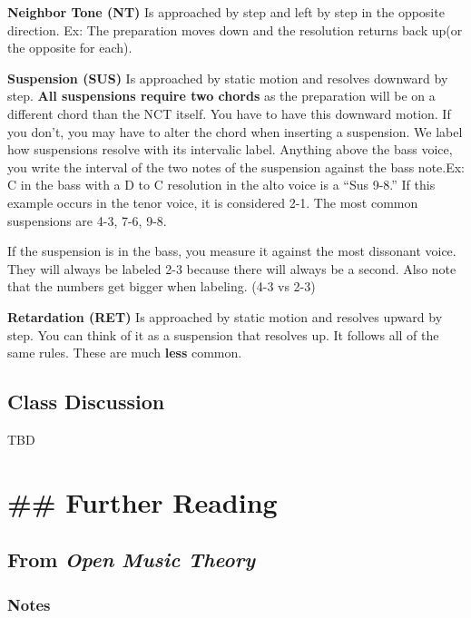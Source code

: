 \documentclass{book}
\begin{document}
\textbf{Neighbor Tone (NT)} Is approached by step and left by step in the
opposite direction. Ex: The preparation moves down and the resolution returns
back up(or the opposite for each).

\textbf{Suspension (SUS)} Is approached by static motion and resolves downward
by step. \textbf{All suspensions require two chords} as the preparation will
be on a different chord than the NCT itself. You have to have this downward
motion. If you don't, you may have to alter the chord when inserting a
suspension. We label how suspensions resolve with its intervalic label.
Anything above the bass voice, you write the interval of the two notes of the
suspension against the bass note.Ex: C in the bass with a D to C resolution in
the alto voice is a ``Sus 9-8.'' If this example occurs in the tenor voice, it
is considered 2-1. The most common suspensions are 4-3, 7-6, 9-8.

If the suspension is in the bass, you measure it against the most dissonant
voice. They will always be labeled 2-3 because there will always be a second.
Also note that the numbers get bigger when labeling. (4-3 vs 2-3)

\textbf{Retardation (RET)} Is approached by static motion and resolves upward
by step. You can think of it as a suspension that resolves up. It follows all
of the same rules. These are much \textbf{less} common.

\hypertarget{class-discussion-7}{%
\section{Class Discussion}\label{class-discussion-7}}

TBD

\hypertarget{further-reading-3}{%
\chapter{\#\# Further Reading}\label{further-reading-3}}

\hypertarget{from-open-music-theory-4}{%
\section{\texorpdfstring{From \emph{Open Music
Theory}}{From Open Music Theory}}\label{from-open-music-theory-4}}

\hypertarget{notes}{%
\subsection{Notes}\label{notes}}
\end{document}
